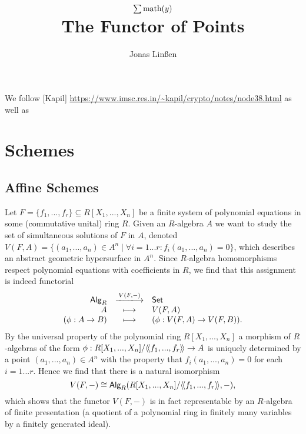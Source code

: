 

\usepackage{extarrows}

\title{$\sum \text{math}(y)$\\The Functor of Points}
\author{Jonas Linßen}



	\maketitle
	\tableofcontents

	We follow [Kapil] \url{https://www.imsc.res.in/~kapil/crypto/notes/node38.html} as well as 


	\newpage
	\section{Schemes}
	\subsection{Affine Schemes}

	Let $F=\{f_1,...,f_r\} \subseteq R[X_1,...,X_n]$ be a finite system of polynomial equations in some (commutative unital) ring $R$. Given an $R$-algebra $A$ we want to study the set of simultaneous solutions of $F$ in $A$, denoted $V(F,A)=\{(a_1,...,a_n) \in A^n \mid \forall i=1 ... r: f_i(a_1,...,a_n) = 0 \}$, which describes an abstract geometric hypersurface in $A^n$.
	Since $R$-algebra homomorphisms respect polynomial equations with coefficients in $R$, we find that this assignment is indeed functorial
	\begin{equation*}
		\begin{array}{rcl}
			\ncat{Alg}_R&\xlongrightarrow{V(F,-)}&\ncat{Set}\\
			A&\longmapsto&V(F,A)\\
			(\phi:A\rightarrow B)&\longmapsto&(\phi:V(F,A)\rightarrow V(F,B)).
		\end{array}
	\end{equation*}
	By the universal property of the polynomial ring $R[X_1,...,X_n]$ a morphism of $R$-algebras of the form $\phi:R[X_1,...,X_n]/\langle\!\langle f_1,...,f_r \rangle\!\rangle \rightarrow A$ is uniquely determined by a point $(a_1,...,a_n)\in A^n$ with the property that $f_i(a_1,...,a_n)=0$ for each $i=1...r$. Hence we find that there is a natural isomorphism 
	\begin{equation*}
		V(F,-) \cong \textsf{Alg}_R(R[X_1,...,X_n]/\langle\!\langle f_1,...,f_r \rangle\!\rangle,-),
	\end{equation*}
	which shows that the functor $V(F,-)$ is in fact representable by an $R$-algebra of finite presentation (a quotient of a polynomial ring in finitely many variables by a finitely generated ideal).


